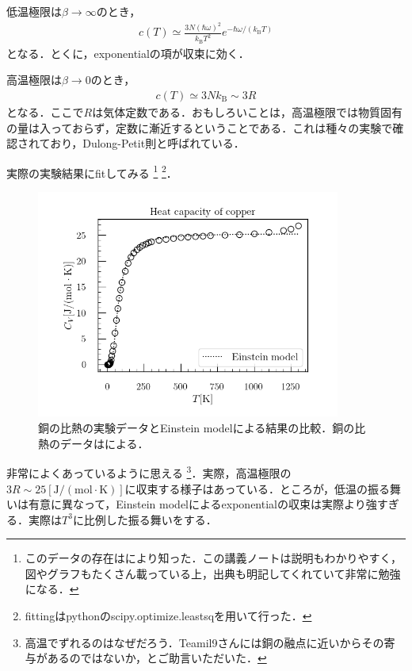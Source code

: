 \documentclass[dvipdfmx, a4paper]{jsarticle}
\theoremstyle{break}
\numberwithin{equation}{section}
\begin{document}
	低温極限は$\beta \to \infty$のとき，
	\begin{align}
			c(T) \simeq \frac{3N(\hbar\omega)^2}{k_{\text{B}}T^2}e^{-\hbar\omega/(k_{\text{B}}T)} \label{einstein_low}
	\end{align}
	となる．とくに，exponentialの項が収束に効く．

	高温極限は$\beta \to 0$のとき，
	\begin{align}
			c(T) \simeq 3Nk_{\text{B}} \sim 3R \label{einstein_high}
	\end{align}
	となる．ここで$R$は気体定数である．おもしろいことは，高温極限では物質固有の量は入っておらず，定数に漸近するということである．これは種々の実験で確認されており，Dulong-Petit則と呼ばれている．

	実際の実験結果にfitしてみる
	\footnote{
			このデータの存在は\cite{ino_condmat}により知った．この講義ノートは説明もわかりやすく，図やグラフもたくさん載っている上，出典も明記してくれていて非常に勉強になる．
	}
	\footnote{
			fittingはpythonのscipy.optimize.leastsqを用いて行った．
	}．
	\begin{figure}[H]
			\centering
			\includegraphics[width=10cm]{./img/einstein_model_copper.png}
			\caption{銅の比熱の実験データとEinstein modelによる結果の比較．銅の比熱のデータは\cite{doi:10.1063/1.555728}による．}
			\label{fig:einstein}
	\end{figure}
	非常によくあっているように思える
	\footnote{
			高温でずれるのはなぜだろう．Teamil9さんには銅の融点に近いからその寄与があるのではないか，とご助言いただいた．
	}．実際，高温極限の$3R\sim 25[\mathrm{J/(mol\cdot K)}]$に収束する様子はあっている．ところが，低温の振る舞いは有意に異なって，Einstein modelによるexponentialの収束は実際より強すぎる．実際は$T^3$に比例した振る舞いをする．
\end{document}
